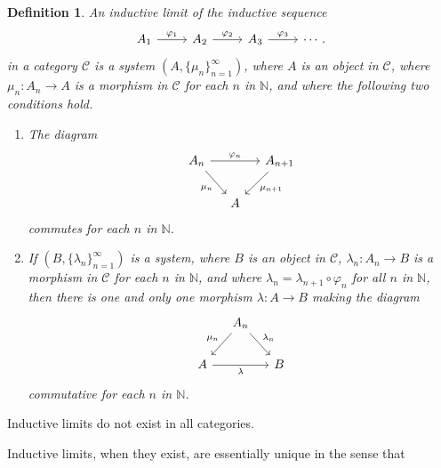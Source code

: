 \documentclass{book}
\newtheorem{definition}{Definition}[section]
\begin{document}
\begin{definition}\label{def:Lars622}
  An \textnormal{inductive limit} of the inductive sequence
  \begin{equation}\label{seq:Lars62}
    \begin{tikzcd}
      A_1\arrow[r,"\varphi_1"]&A_2\arrow[r,"\varphi_2"]&A_3\arrow[r,"\varphi_3"]&\cdots.
    \end{tikzcd}
  \end{equation}
  in a category \(\mathcal{C}\) is a system \((A,\{\mu_n\}_{n=1}^\infty)\), where \(A\) is an object in \(\mathcal{C}\),
  where \(\mu_n:A_n\to A\) is a morphism in \(\mathcal{C}\) for each \(n\) in \(\mathbb{N}\), and where the following two conditions hold.
  \begin{enumerate}
    \item The diagram
      \begin{equation}\label{diag:Lars63}
        \begin{tikzcd}[column sep=small]
          A_n
            \arrow[rr, "\varphi_n"]
            \arrow[dr, "\mu_n"']
          &&
          A_{n+1}
            \arrow[dl, "\mu_{n+1}"]
          \\
          & A &
        \end{tikzcd}
      \end{equation}
      commutes for each \(n\) in \(\mathbb{N}\).
    \item If \((B,\{\lambda_n\}_{n=1}^\infty)\) is a system, where \(B\) is an object in \(\mathcal{C}\),
      \(\lambda_n:A_n\to B\) is a morphism in \(\mathcal{C}\) for each \(n\) in \(\mathbb{N}\), and where \(\lambda_n=\lambda_{n+1}\circ\varphi_n\)
      for all \(n\) in \(\mathbb{N}\), then there is one and only one morphism \(\lambda:A\to B\) making the diagram
      \begin{equation}\label{diag:Lars64}
        \begin{tikzcd}[column sep=small]
          & A_n
            \arrow[dl, "\mu_{n}",swap]
            \arrow[dr, "\lambda_n"] &\\
          A\arrow[rr, "\lambda",swap]
          &&
          B
        \end{tikzcd}
      \end{equation}
      commutative for each \(n\) in \(\mathbb{N}\).
  \end{enumerate}
\end{definition}
Inductive limits do not exist in all categories.\par
Inductive limits, when they exist, are essentially unique in the sense that
\end{document}
